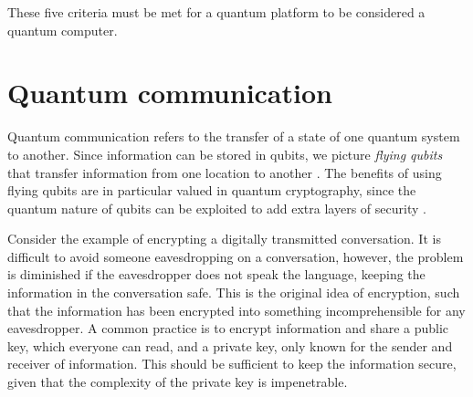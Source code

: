 These five criteria must be met for a quantum platform to be considered a quantum computer.




\section{Quantum communication}

Quantum communication refers to the transfer of a state of one quantum system to another. Since information can be stored in qubits, we picture \textit{flying qubits} that transfer information from one location to another \cite{Griffiths2002}. The benefits of using flying qubits are in particular valued in quantum cryptography, since the quantum nature of qubits can be exploited to add extra layers of security \cite{Pavicic2006}.



Consider the example of encrypting a digitally transmitted conversation. It is difficult to avoid someone eavesdropping on a conversation, however, the problem is diminished if the eavesdropper does not speak the language, keeping the information in the conversation safe. This is the original idea of encryption, such that the information has been encrypted into something incomprehensible for any eavesdropper. A common practice is to encrypt information and share a public key, which everyone can read, and a private key, only known for the sender and receiver of information. This should be sufficient to keep the information secure, given that the complexity of the private key is impenetrable.

